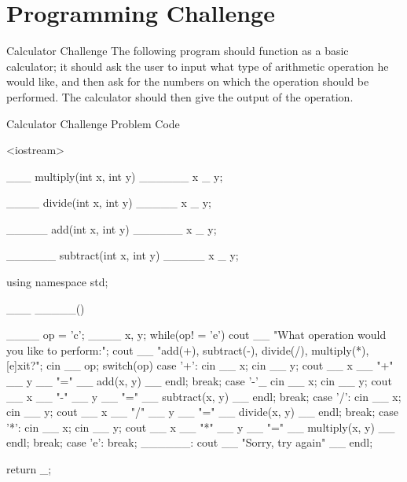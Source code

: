 \documentclass[../lecture1-variables.tex]{subfiles}
\begin{document}
\section{Programming Challenge}


\begin{frame}[fragile]{Calculator Challenge}
    The following program should function as a basic calculator; it should ask
    the user to input what type of arithmetic operation he would like, and then
    ask for the numbers on which the operation should be performed. The calculator
    should then give the output of the operation.
\end{frame}

\begin{frame}[fragile]{Calculator Challenge Problem Code}
    \begin{cppcode}[]
         <iostream>

___ multiply(int x, int y)
{
    ______ x _ y;
}

____ divide(int x, int y)
{
    _____ x _ y;
}

_____ add(int x, int y)
{
    ______ x _ y;
}

______ subtract(int x, int y)
{
    _____ x _ y;
}

using namespace std;

___ _____()
{
    ____ op = 'c';
    ____ x, y;
    while(op! = 'e')
    {
        cout __ "What operation would you like to perform:";
        cout __ "add(+), subtract(-), divide(/), multiply(*), [e]xit?";
        cin __ op;
        switch(op)
        {
            case '+':
                cin __ x;
                cin __ y;
                cout __ x __ "+" __ y __ "=" __ add(x, y) __ endl;
                break;
            case '-'_
                cin __ x;
                cin __ y;
                cout __ x __ "-" __ y __ "=" __ subtract(x, y) __ endl;
                break;
            case '/':
                cin __ x;
                cin __ y;
                cout __ x __ "/" __ y __ "=" __ divide(x, y) __ endl;
                break;
            case '*':
                cin __ x;
                cin __ y;
                cout __ x __ "*" __ y __ "=" __ multiply(x, y) __ endl;
                break;
            case 'e':
                break;
            ______:
                cout __ "Sorry, try again" __ endl;
        }
    }

    return _;
}
    \end{cppcode}
\end{frame}
\end{document}
